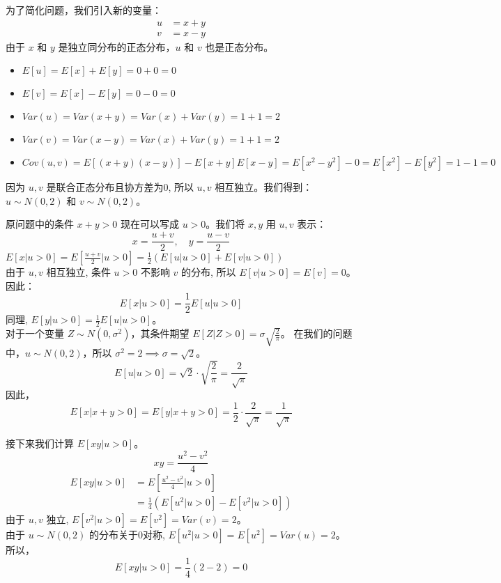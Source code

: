 \documentclass[UTF8]{ctexart}
\begin{document}
    为了简化问题，我们引入新的变量：
    \begin{align*}
    u &= x + y \\
    v &= x - y
    \end{align*}
    由于 $x$ 和 $y$ 是独立同分布的正态分布，$u$ 和 $v$ 也是正态分布。
    \begin{itemize}
        \item $E[u] = E[x] + E[y] = 0 + 0 = 0$
        \item $E[v] = E[x] - E[y] = 0 - 0 = 0$
        \item $Var(u) = Var(x+y) = Var(x) + Var(y) = 1 + 1 = 2$
        \item $Var(v) = Var(x-y) = Var(x) + Var(y) = 1 + 1 = 2$
        \item $Cov(u, v) = E[(x+y)(x-y)] - E[x+y]E[x-y] = E[x^2 - y^2] - 0 = E[x^2] - E[y^2] = 1 - 1 = 0$
    \end{itemize}
    因为 $u, v$ 是联合正态分布且协方差为0, 所以 $u, v$ 相互独立。我们得到：\\
    $u \sim N(0, 2)$ 和 $v \sim N(0, 2)$。

    原问题中的条件 $x+y > 0$ 现在可以写成 $u > 0$。我们将 $x, y$ 用 $u, v$ 表示：
    \[ x = \frac{u+v}{2}, \quad y = \frac{u-v}{2} \]
    $E[x | u>0] = E\left[\frac{u+v}{2} \bigg| u>0\right] = \frac{1}{2} (E[u | u>0] + E[v | u>0])$ \\
    由于 $u, v$ 相互独立, 条件 $u>0$ 不影响 $v$ 的分布, 所以 $E[v | u>0] = E[v] = 0$。因此：
    \[ E[x | u>0] = \frac{1}{2} E[u | u>0] \]
    同理, $E[y | u>0] = \frac{1}{2} E[u | u>0]$。\\
    对于一个变量 $Z \sim N(0, \sigma^2)$，其条件期望 $E[Z | Z>0] = \sigma \sqrt{\frac{2}{\pi}}$。
    在我们的问题中，$u \sim N(0, 2)$，所以 $\sigma^2 = 2 \implies \sigma = \sqrt{2}$。
    \[ E[u | u>0] = \sqrt{2} \cdot \sqrt{\frac{2}{\pi}} = \frac{2}{\sqrt{\pi}} \]
    因此，
    \[ E[x | x+y>0] = E[y | x+y>0] = \frac{1}{2} \cdot \frac{2}{\sqrt{\pi}} = \frac{1}{\sqrt{\pi}} \]
    
    接下来我们计算 $E[xy | u>0]$。
    \[ xy = \frac{u^2 - v^2}{4} \]
    \begin{align*}
    E[xy | u>0] &= E\left[\frac{u^2 - v^2}{4} \bigg| u>0\right] \\
    &= \frac{1}{4} (E[u^2 | u>0] - E[v^2 | u>0])
    \end{align*}
    由于 $u,v$ 独立, $E[v^2|u>0] = E[v^2] = Var(v) = 2$。\\
    由于 $u \sim N(0,2)$ 的分布关于0对称, $E[u^2 | u>0] = E[u^2] = Var(u) = 2$。\\
    所以，
    \[ E[xy | u>0] = \frac{1}{4} (2 - 2) = 0 \]
\end{document}
